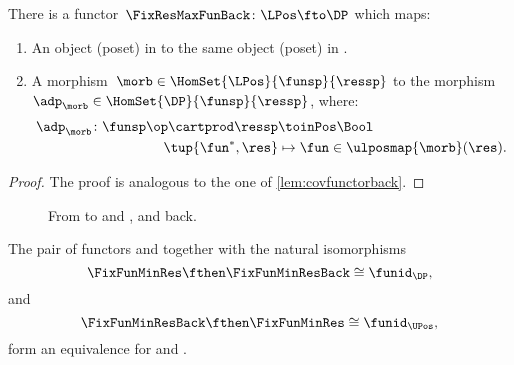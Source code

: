 \begin{lemma}
	\label{lem:cofunctorback}
	There is a functor~$\FixResMaxFunBack\colon \LPos \fto \DP$ which maps:
	\begin{enumerate}
		\item An object (poset) in \UPos to the same object (poset) in \DP.
		\item A morphism~$\morb\in \HomSet{\LPos}{\funsp}{\ressp}$ to the morphism~$\adp_\morb \in \HomSet{\DP}{\funsp}{\ressp}$, where:
		      \begin{equation}
			      \begin{aligned}
				      \adp_\morb\colon \funsp\op \cartprod \ressp & \toinPos \Bool                           \\
				      \tup{\fun^*,\res}                           & \mapsto \fun \in \ulposmap{\morb}(\res).
			      \end{aligned}
		      \end{equation}
	\end{enumerate}
\end{lemma}

\begin{proof}
	The proof is analogous to the one of \cref{lem:covfunctorback}.
\end{proof}

\begin{figure}[tbh]
	\centering
	\caption{From \DP to \UPos and \LPos, and back.}
\end{figure}


\begin{lemma}
	The pair of functors \FixFunMinRes and \FixFunMinResBack together with the natural isomorphisms
	\begin{equation*}
		\FixFunMinRes \fthen \FixFunMinResBack \cong \funid_\DP,
	\end{equation*}
	and
	\begin{equation*}
		\FixFunMinResBack \fthen \FixFunMinRes \cong \funid_\UPos,
	\end{equation*}
	form an equivalence for \DP and \UPos.
\end{lemma}

